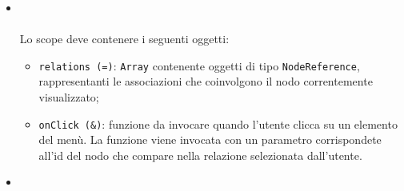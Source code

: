 \begin{itemize}
\begin{itemize}
\item {}
\\ \dpIsolatedScope \\
Lo scope deve contenere i seguenti oggetti:
\begin{itemize}
\item \texttt{relations (=)}: \texttt{Array} contenente oggetti di tipo \texttt{NodeReference}, rappresentanti le associazioni che coinvolgono il nodo correntemente visualizzato;
\item \texttt{onClick (\&)}: funzione da invocare quando l’utente clicca su un elemento del menù. La funzione viene invocata con un parametro corrispondete all’id del nodo che compare nella relazione selezionata dall’utente.
\end{itemize}
\item {}
\\ \dpTemplateUrl
\end{itemize}
\end{itemize}
\subsection{}
\label{\nogloxy{Premi::Front-End::Model}}

